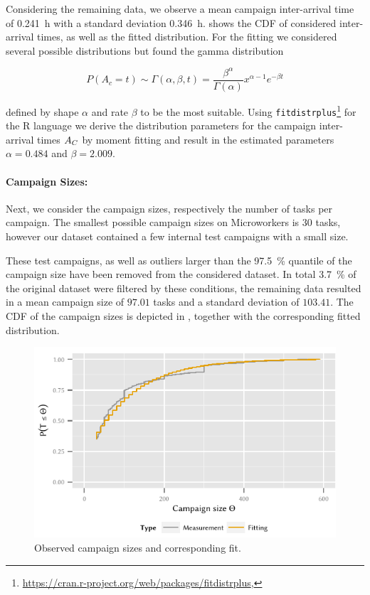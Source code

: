 Considering the remaining data, we observe a mean campaign inter-arrival time of \SI{0.241}{\hour} with a standard deviation \SI{0.346}{\hour}.
 shows the \gls{CDF} of considered inter-arrival times, as well as the fitted distribution.
For the fitting we considered several possible distributions but found the gamma distribution

\[
P(A_c=t) \sim \Gamma(\alpha,\beta,t) = \frac{\beta^\alpha}{\Gamma(\alpha)} x^{\alpha-1} e^{-{\beta}t}
\]

defined by shape \(\alpha\) and rate \(\beta\) to be the most suitable.
Using \texttt{fitdistrplus}\footnote{\url{https://cran.r-project.org/web/packages/fitdistrplus}, \accessed} for the R language we derive the distribution parameters for the campaign inter-arrival times \(A_C\) by moment fitting and result in the estimated parameters \(\alpha=0.484\) and \(\beta=2.009\).

\paragraph*{Campaign Sizes:}Next, we consider the campaign sizes, respectively the number of tasks per campaign.
The smallest possible campaign sizes on Microworkers is \(30\) tasks, however our dataset contained a few internal test campaigns with a small size.

These test campaigns, as well as outliers larger than the \SI{97.5}{\percent} quantile of the campaign size have been removed from the considered dataset.
In total \SI{3.7}{\percent} of the original dataset were filtered by these conditions, the remaining data resulted in a mean campaign size of \(97.01\) tasks and a standard deviation of \(103.41\).
The \gls{CDF} of the campaign sizes \campaignSize is depicted in , together with the corresponding fitted distribution.

\begin{figure}
  \centering
  \includegraphics{cloud/crowdsourcing/measurements/figures/campaign_sizes}
  \caption{Observed campaign sizes \campaignSize and corresponding fit.}
  \label{fig:cloud:crowdsourcing:measurements:parameters:campaign_sizes}
\end{figure}

